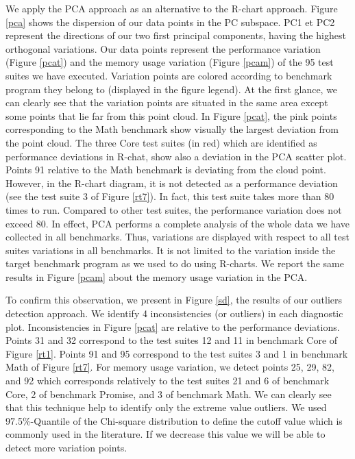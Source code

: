 We apply the PCA approach as an alternative to the R-chart approach. Figure \ref{pca} shows the dispersion of our data points in the PC subspace. PC1 et PC2 represent the directions of our two first principal components, having the highest orthogonal variations. Our data points represent the performance variation (Figure \ref{pcat}) and the memory usage variation (Figure \ref{pcam}) of the 95 test suites we have executed. Variation points are colored according to benchmark program they belong to (displayed in the figure legend). At the first glance, we can clearly see that the variation points are situated in the same area except some points that lie far from this point cloud. In Figure \ref{pcat}, the pink points corresponding to the Math benchmark show visually the largest deviation from the point cloud. The three Core test suites (in red) which are identified as performance deviations in R-chat, show also a deviation in the PCA scatter plot. Points 91 relative to the Math benchmark is deviating from the cloud point. However, in the R-chart diagram, it is not detected as a performance deviation (see the test suite 3 of Figure \ref{rt7}). In fact, this test suite takes more than 80 times to run. Compared to other test suites, the performance variation does not exceed 80. In effect, PCA performs a complete analysis of the whole data we have collected in all benchmarks. Thus, variations are displayed with respect to all test suites variations in all benchmarks. It is not limited to the variation inside the target benchmark program as we used to do using R-charts. We report the same results in Figure \ref{pcam} about the memory usage variation in the PCA. 


To confirm this observation, we present in Figure \ref{sd}, the results of our outliers detection approach. We identify 4 inconsistencies (or outliers) in each diagnostic plot. Inconsistencies in Figure \ref{pcat} are relative to the performance deviations. Points 31 and 32 correspond to the test suites 12 and 11 in benchmark Core of Figure \ref{rt1}. Points 91 and 95 correspond to the test suites 3 and 1 in benchmark Math of Figure \ref{rt7}. For memory usage variation, we detect points 25, 29, 82, and 92 which corresponds relatively to the test suites 21 and 6 of benchmark Core, 2 of benchmark Promise, and 3 of benchmark Math.
We can clearly see that this technique help to identify only the extreme value outliers. We used 97.5\%-Quantile of the Chi-square distribution to define the cutoff value which is commonly used in the literature\cite{enot2008preprocessing,hubert2009robust}. If we decrease this value we will be able to detect more variation points. 


